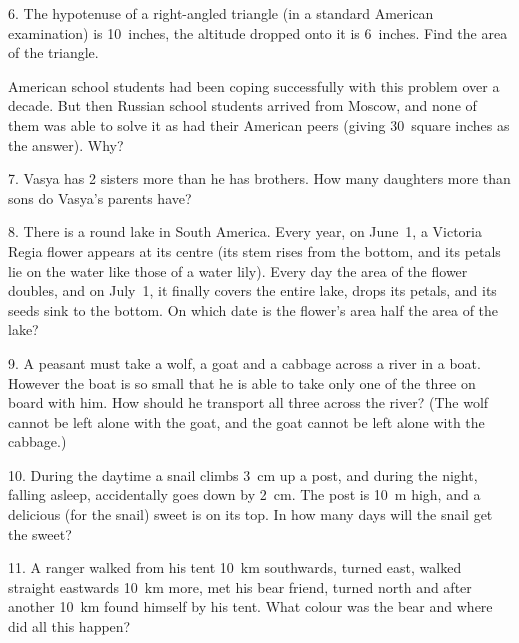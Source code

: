 \begin{problem}{6.}
	The hypotenuse of a right-angled triangle (in a standard American examination) is 10~inches,
	the altitude dropped onto it is 6~inches. Find the area of the triangle.

	American school students had been coping successfully with this problem over a decade.
	But then Russian school students arrived from Moscow, and none of them was able to solve it as had their American peers
	(giving 30~square inches as the answer). Why? 
\end{problem}

\begin{problem}{7.}
	Vasya has 2 sisters more than he has brothers. How many daughters more than sons do Vasya's parents have?
\end{problem}

\begin{problem}{8.}
	There is a round lake in South America. Every year, on June~1, a Victoria Regia flower appears at its
	centre (its stem rises from the bottom, and its petals lie on the water like those of a water lily). Every day
	the area of the flower doubles, and on July~1, it finally covers the entire lake, drops its petals, and its seeds
	sink to the bottom. On which date is the flower's area half the area of the lake?    
\end{problem}

\begin{problem}{9.}
	A peasant must take a wolf, a goat and a cabbage across a river in a boat. However the boat is so small that
	he is able to take only one of the three on board with him. How should he transport all three across
	the river? (The wolf cannot be left alone with the goat, and the goat cannot be left alone with the cabbage.)
\end{problem}

\begin{problem}{10.}
	During the daytime a snail climbs \SI{3}{\cm} up a post, and during the night, falling asleep, accidentally
	goes down by \SI{2}{\cm}. The post is \SI{10}{\metre} high, and a delicious (for the snail) sweet is on its top.
	In how many days will the snail get the sweet?
\end{problem}

\begin{problem}{11.}
	A ranger walked from his tent \SI{10}{\km} southwards, turned east, walked straight eastwards \SI{10}{\km} more,
	met his bear friend, turned north and after another \SI{10}{\km} found himself by his tent. What colour was the bear
	and where did all this happen?
\end{problem}

